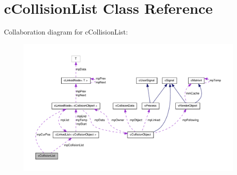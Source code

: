 \hypertarget{classc_collision_list}{
\section{cCollisionList Class Reference}
\label{classc_collision_list}
}


Collaboration diagram for cCollisionList:
\nopagebreak
\begin{figure}[H]
\begin{center}
\leavevmode
\includegraphics[width=400pt]{classc_collision_list__coll__graph}
\end{center}
\end{figure}
